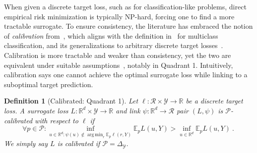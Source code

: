 \documentclass{article} %
\newcommand{\reals}{\mathbb{R}}
\newcommand{\simplex}{\Delta_\Y}
\newcommand{\E}{\mathbb{E}}
\newcommand{\R}{\mathcal{R}}
\renewcommand{\P}{\mathcal{P}}
\newcommand{\Y}{\mathcal{Y}}
\newcommand{\exploss}[3]{\E_{#3} #1(#2,Y)}
\newtheorem{definition}{Definition}
\DeclareMathOperator*{\argmin}{arg\,min}
\begin{document}
When given a discrete target loss, such as for classification-like problems, direct empirical risk minimization is typically NP-hard, forcing one to find a more tractable surrogate.
To ensure consistency, the literature has embraced the notion of \emph{calibration} from~\citet[Chapter 3]{steinwart2008support}, which aligns with the definition in~\citet{tewari2007consistency} for multiclass classification, and its generalizations to arbitrary discrete target losses~\citep{agarwal2015consistent,ramaswamy2016convex}.
Calibration is more tractable and weaker than consistency, yet the two are equivalent under suitable assumptions~\citep{tewari2007consistency,ramaswamy2016convex}, notably in Quadrant 1.
Intuitively, calibration says one cannot achieve the optimal surrogate loss while linking to a suboptimal target prediction.


\begin{definition}[Calibrated: Quadrant 1]\label{def:calibrated-finite}
	Let $\ell : \R \times \Y \to \reals$ be a discrete target loss.
	A surrogate loss $L : \reals^d \times \Y \to \reals$  and link $\psi:\reals^d \to \R$ pair $(L, \psi)$ is \emph{$\P$-calibrated with respect to} $\ell$ if 
	\begin{equation}\label{eq:calibration}
	\forall p \in \P: \inf_{u \in \reals^d : \psi(u) \not \in \argmin_r \E_p\ell(r,Y)} \exploss{L}{u}{p} > \inf_{u \in \reals^d} \exploss{L}{u}{p}~.~
	\end{equation}
	We simply say $L$ is calibrated if $\P = \simplex$.
\end{definition}
\end{document}
